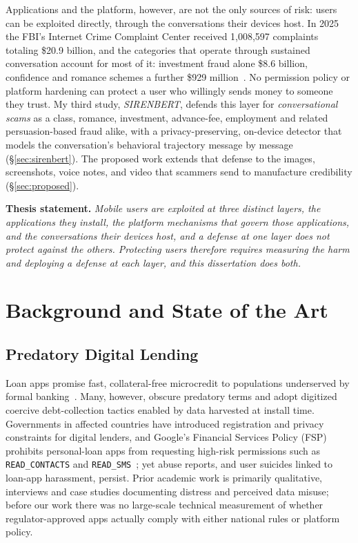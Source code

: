 \documentclass[letterpaper,11pt]{article}
\begin{document}
Applications and the platform, however, are not the only sources of
risk: users can be exploited directly, through the conversations their
devices host. In 2025 the FBI's Internet Crime Complaint Center
received 1,008,597 complaints totaling \$20.9 billion, and the
categories that operate through sustained conversation account for
most of it: investment fraud alone \$8.6 billion, confidence and
romance schemes a further \$929 million~\cite{ic32025}. No permission
policy or platform hardening can protect a user who willingly sends
money to someone they trust. My third study, \emph{SIRENBERT}, defends
this layer for \emph{conversational scams} as a class, romance,
investment, advance-fee, employment and related persuasion-based fraud
alike, with a privacy-preserving, on-device detector that models the
conversation's behavioral trajectory message by message
(\S\ref{sec:sirenbert}). The proposed work extends that defense to the
images, screenshots, voice notes, and video that scammers send to
manufacture credibility (\S\ref{sec:proposed}).

\textbf{Thesis statement.} \emph{Mobile users are exploited at three
distinct layers, the applications they install, the platform mechanisms
that govern those applications, and the conversations their devices
host, and a defense at one layer does not protect against the others.
Protecting users therefore requires measuring the harm and deploying a
defense at each layer, and this dissertation does both.}

\section{Background and State of the Art}
\label{sec:background}

\subsection{Predatory Digital Lending}
Loan apps promise fast, collateral-free microcredit to populations
underserved by formal banking~\cite{suri2016mpesa}. Many, however,
obscure predatory terms and adopt digitized coercive debt-collection
tactics enabled by data harvested at install time. Governments in
affected countries have introduced registration and privacy
constraints for digital lenders, and Google's Financial Services
Policy (FSP) prohibits personal-loan apps from requesting high-risk
permissions such as \texttt{READ\_CONTACTS} and
\texttt{READ\_SMS}~\cite{googlefsp}; yet abuse reports, and user
suicides linked to loan-app harassment, persist. Prior academic work
is primarily qualitative, interviews and case studies documenting
distress and perceived data misuse; before our work there was no
large-scale technical measurement of whether regulator-approved apps
actually comply with either national rules or platform policy.
\end{document}
